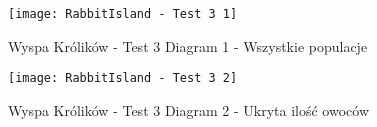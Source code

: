 \begin{figure}[H]
	\texttt{[image: RabbitIsland - Test 3 1]}
	\caption{Wyspa Królików - Test 3 Diagram 1 - Wszystkie populacje}
	\label{fig:rabbitIslandTest3Diagram1}
\end{figure}

\begin{figure}[H]
	\texttt{[image: RabbitIsland - Test 3 2]}
	\caption{Wyspa Królików - Test 3 Diagram 2 - Ukryta ilość owoców }
	\label{fig:rabbitIslandTest3Diagram2}
\end{figure}
